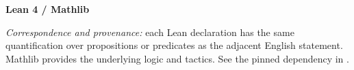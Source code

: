 \begin{minipage}[t]{0.50\textwidth}
\textbf{Lean 4 / Mathlib}



\textit{Correspondence and provenance:}
each Lean declaration has the same quantification
over propositions or predicates as the adjacent English
statement. Mathlib provides the underlying logic and tactics.
See the pinned dependency in
\texttt{}.
\end{minipage}
\endgroup
